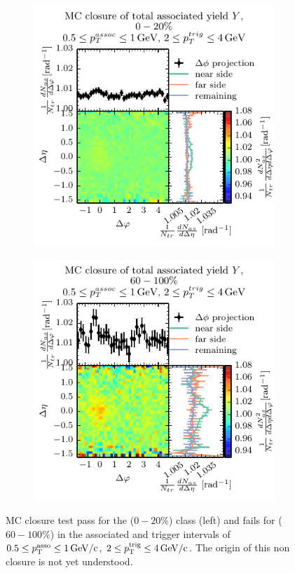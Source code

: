 \begin{figure}
  \centering
  \begin{subfigure}[b]{.5\textwidth}
    \includegraphics{figures/no-closure-uncorrected-cent.pdf}    
  \end{subfigure}%
  \begin{subfigure}[b]{.5\textwidth}
    \includegraphics{figures/no-closure-uncorrected.pdf}    
  \end{subfigure}
  \caption[MC closure test pass for the ($0-20\%$) and ($60-100\%$) multiplicity class.]{MC closure test pass for the ($0-20\%$) class (left) and fails for ($60-100\%$) in the associated and trigger intervals of $0.5 \le p_{\text{T}}^{\text{asso}} \le \SI{1}{GeV/c}$, $2 \le p_{\text{T}}^{\text{trig}} \le \SI{4}{GeV/c}$. The origin of this non closure is not yet understood.}
  \label{fig:non-closure_2-4_no_thresh}
\end{figure}

